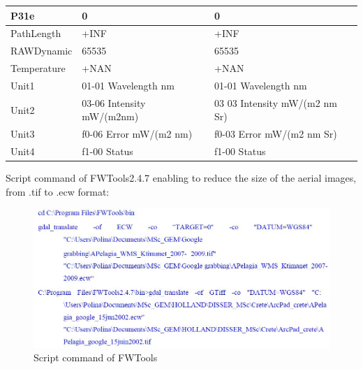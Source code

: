 \documentclass[10pt, a4paper]{article}
\begin{document}
\begin{appendices}
\begin{table}
\begin{tabular}{| p{3cm} | p{3cm} | p{5cm} |}
   P31e & 0 & 0 \\ \hline
   PathLength & +INF & +INF \\ \hline
   RAWDynamic & 65535 & 65535 \\ \hline
   Temperature & +NAN & +NAN \\ \hline
   Unit1 & 01-01 Wavelength nm &  01-01 Wavelength nm \\ \hline
   Unit2 & 03-06 Intensity mW/(m2nm) & 03 03 Intensity mW/(m2 nm Sr) \\ \hline
   Unit3 & f0-06 Error mW/(m2 nm) & f0-03 Error mW/(m2 nm Sr) \\ \hline
  Unit4 & f1-00 Status & f1-00 Status \\ \hline
  \end{tabular}
\end{table}

Script command of FWTools2.4.7 enabling to reduce the size of the aerial images, from .tif to .ecw
format:
\begin{figure}[h]
\begin{center}
\includegraphics[scale=0.25]{Script_Gdal.jpg}
\caption{Script command of FWTools}
\label{fig:61}
\end{center}
\end{figure}
\pagebreak
\newpage


\end{appendices}
\end{document}
